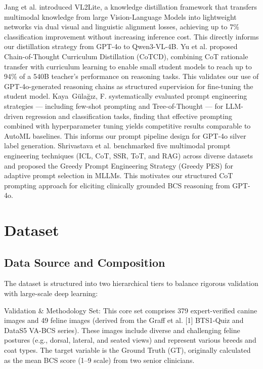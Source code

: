 \documentclass[11pt,twocolumn]{article}
\begin{document}
Jang et al. \cite{jang2025vl2lite} introduced VL2Lite, a knowledge distillation framework that transfers multimodal knowledge from large Vision-Language Models into lightweight networks via dual visual and linguistic alignment losses, achieving up to 7\% classification improvement without increasing inference cost. This directly informs our distillation strategy from GPT-4o to Qwen3-VL-4B. Yu et al. \cite{cotcd2025} proposed Chain-of-Thought Curriculum Distillation (CoTCD), combining CoT rationale transfer with curriculum learning to enable small student models to reach up to 94\% of a 540B teacher's performance on reasoning tasks. This validates our use of GPT-4o-generated reasoning chains as structured supervision for fine-tuning the student model. Kaya~G{\"u}la{\u{g}}{\i}z, F.  \cite{kaya2025promptml} systematically evaluated prompt engineering strategies — including few-shot prompting and Tree-of-Thought — for LLM-driven regression and classification tasks, finding that effective prompting combined with hyperparameter tuning yields competitive results comparable to AutoML baselines. This informs our prompt pipeline design for GPT-4o silver label generation. Shrivastava et al. \cite{shrivastava2025mllmprompt} benchmarked five multimodal prompt engineering techniques (ICL, CoT, SSR, ToT, and RAG) across diverse datasets and proposed the Greedy Prompt Engineering Strategy (Greedy PES) for adaptive prompt selection in MLLMs. This motivates our structured CoT prompting approach for eliciting clinically grounded BCS reasoning from GPT-4o.


\section{Dataset}

\subsection{Data Source and Composition}

The dataset is structured into two hierarchical tiers to balance rigorous validation with large-scale deep learning:

Validation & Methodology Set: This core set comprises 379 expert-verified canine images and 49 feline images (derived from the Graff et al. [1] BTS1-Quiz and DataS5 VA-BCS series). These images include diverse and challenging feline postures (e.g., dorsal, lateral, and seated views) and represent various breeds and coat types. The target variable is the Ground Truth (GT), originally calculated as the mean BCS score (1–9 scale) from two senior clinicians.
\end{document}
